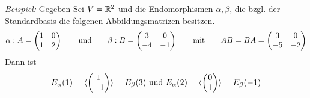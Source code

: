 \textit{Beispiel:}
    Gegeben Sei $V=\mathbb{R}^2$ und die Endomorphismen $\alpha,\beta$, die bzgl. der Standardbasis die folgenen Abbildungsmatrizen besitzen.
    \begin{equation*}
        \alpha:A=\left(\begin{matrix}1&0\\1&2\end{matrix}\right) \qquad \mbox{und} \qquad \beta:B=\left(\begin{matrix}3&0\\-4&-1\end{matrix}\right) \qquad \mbox{mit} \qquad AB=BA=\left(\begin{matrix}3&0\\-5&-2\end{matrix}\right)
    \end{equation*}
    Dann ist 
    \begin{equation*}
        E_{\alpha}(1) = \langle \left(\begin{matrix}1\\-1\end{matrix}\right) \rangle = E_{\beta}(3) \mbox{ und }	E_{\alpha}(2) = \langle \left(\begin{matrix}0\\ 1\end{matrix}\right) \rangle = E_{\beta}(-1)
    \end{equation*}

